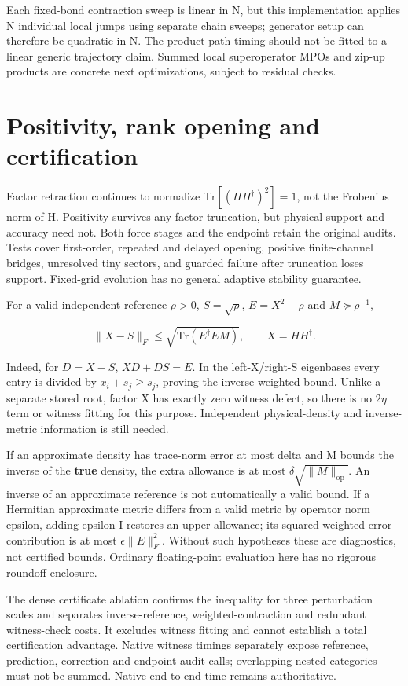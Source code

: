\documentclass[10pt]{article}
\begin{document}
Each fixed-bond contraction sweep is linear in N, but this implementation
applies N individual local jumps using separate chain sweeps; generator setup
can therefore be quadratic in N. The product-path timing should not be fitted
to a linear generic trajectory claim. Summed local superoperator MPOs and
zip-up products are concrete next optimizations, subject to residual checks.

\section*{Positivity, rank opening and certification}

Factor retraction continues to normalize $\mathrm{Tr}[(HH^\dagger)^2]=1$,
not the Frobenius norm of H. Positivity survives any factor truncation, but
physical support and accuracy need not. Both force stages and the endpoint
retain the original audits. Tests cover first-order, repeated and delayed
opening, positive finite-channel bridges, unresolved tiny sectors, and guarded
failure after truncation loses support. Fixed-grid evolution has no general
adaptive stability guarantee.

For a valid independent reference $\rho>0$, $S=\sqrt\rho$,
$E=X^2-\rho$ and $M\succeq\rho^{-1}$,

\[
\|X-S\|_F\leq\sqrt{\mathrm{Tr}(E^\dagger EM)},\qquad X=HH^\dagger.
\]

Indeed, for $D=X-S$, $XD+DS=E$. In the left-X/right-S eigenbases every
entry is divided by $x_i+s_j\geq s_j$, proving the inverse-weighted bound.
Unlike a separate stored root, factor X has exactly zero witness defect, so
there is no $2\eta$ term or witness fitting for this purpose. Independent
physical-density and inverse-metric information is still needed.

If an approximate density has trace-norm error at most delta and M bounds the
inverse of the \textbf{true} density, the extra allowance is at most
$\delta\sqrt{\|M\|_{\mathrm{op}}}$. An inverse of an approximate reference is
not automatically a valid bound. If a Hermitian approximate metric differs
from a valid metric by operator norm epsilon, adding epsilon I restores an
upper allowance; its squared weighted-error contribution is at most
$\epsilon\|E\|_F^2$. Without such hypotheses these are diagnostics, not certified
bounds. Ordinary floating-point evaluation here has no rigorous roundoff enclosure.

The dense certificate ablation confirms the inequality for three perturbation
scales and separates inverse-reference, weighted-contraction and redundant
witness-check costs. It excludes witness fitting and cannot establish a total
certification advantage. Native witness timings separately expose reference,
prediction, correction and endpoint audit calls; overlapping nested categories
must not be summed. Native end-to-end time remains authoritative.
\end{document}
